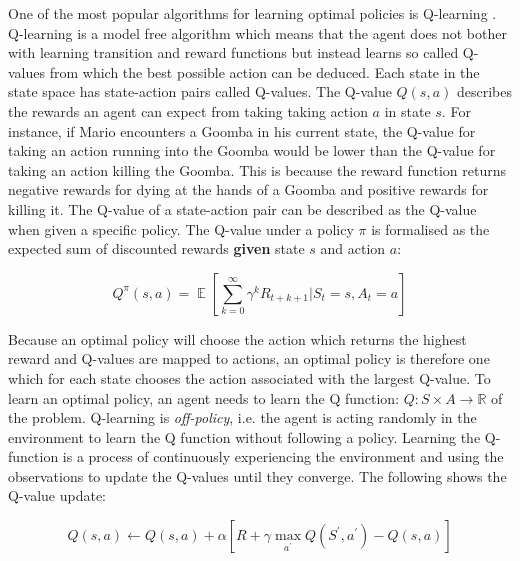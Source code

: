 \documentclass[notitlepage,a4paper,11pt]{article}
\newcommand{\R}{\mathbb{R}}
\DeclareMathOperator{\E}{\mathbb{E}}
\begin{document}
One of the most popular algorithms for learning optimal policies is Q-learning \cite{watkins1992q}. Q-learning is a model free algorithm which means that the agent does not bother with learning transition and reward functions but instead learns so called Q-values from which the best possible action can be deduced. Each state in the state space has state-action pairs called Q-values. The Q-value $Q(s,a)$ describes the rewards an agent can expect from taking taking action $a$ in state $s$. For instance, if Mario encounters a Goomba in his current state, the Q-value for taking an action running into the Goomba would be lower than the Q-value for taking an action killing the Goomba. This is because the reward function returns negative rewards for dying at the hands of a Goomba and positive rewards for killing it. The Q-value of a state-action pair can be described as the Q-value when given a specific policy. The Q-value under a policy $\pi$ is formalised as the expected sum of discounted rewards \textbf{given} state $s$ and action $a$:

\begin{equation}
 Q^\pi(s, a) = \E \left[ \sum_{k=0}^{\infty} \gamma^k R_{t+k+1} \Big| S_t = s, A_t = a \right]
\end{equation}


Because an optimal policy will choose the action which returns the highest reward and Q-values are mapped to actions, an optimal policy is therefore one which for each state chooses the action associated with the largest Q-value. To learn an optimal policy, an agent needs to learn the Q function: $Q : S \times A \to \R$ of the problem. Q-learning is \textit{off-policy}, i.e. the agent is acting randomly in the environment to learn the Q function without following a policy. Learning the Q-function is a process of continuously experiencing the environment and using the observations to update the Q-values until they converge. The following shows the Q-value update:

\begin{equation} \label{q_update}
	Q(s,a) \gets Q(s,a) + \alpha \left[ R + \gamma \max\limits_{a^\prime} Q(S^\prime, a^\prime) - Q(s,a) \right]
\end{equation}
\end{document}
